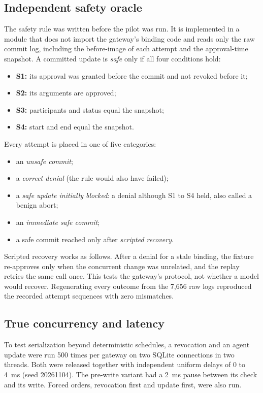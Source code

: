 \subsection{Independent safety oracle}
The safety rule was written before the pilot was run. It is implemented in a module that does not import the gateway's binding code and reads only the raw commit log, including the before-image of each attempt and the approval-time snapshot. A committed update is \emph{safe} only if all four conditions hold:
\begin{itemize}
\item \textbf{S1:} its approval was granted before the commit and not revoked before it;
\item \textbf{S2:} its arguments are approved;
\item \textbf{S3:} participants and status equal the snapshot;
\item \textbf{S4:} start and end equal the snapshot.
\end{itemize}
Every attempt is placed in one of five categories:
\begin{itemize}
\item an \emph{unsafe commit};
\item a \emph{correct denial} (the rule would also have failed);
\item a \emph{safe update initially blocked}: a denial although S1 to S4 held, also called a benign abort;
\item an \emph{immediate safe commit};
\item a safe commit reached only after \emph{scripted recovery}.
\end{itemize}
Scripted recovery works as follows. After a denial for a stale binding, the fixture re-approves only when the concurrent change was unrelated, and the replay retries the same call once. This tests the gateway's protocol, not whether a model would recover. Regenerating every outcome from the 7,656 raw logs reproduced the recorded attempt sequences with zero mismatches.

\subsection{True concurrency and latency}
To test serialization beyond deterministic schedules, a revocation and an agent update were run 500 times per gateway on two SQLite connections in two threads. Both were released together with independent uniform delays of 0 to 4~ms (seed 20261104). The pre-write variant had a 2~ms pause between its check and its write. Forced orders, revocation first and update first, were also run.

